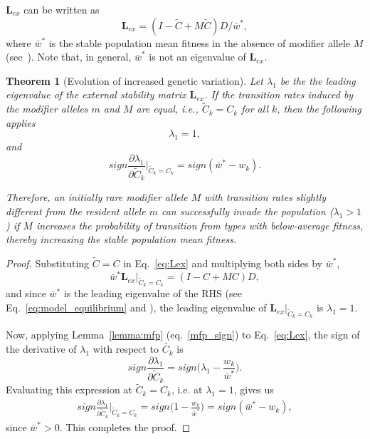 \documentclass[9pt, a4paper, twocolumn]{extarticle}
\newtheorem{theorem}{Theorem}
\newcommand{\cl}{\mathbf{L}}
\begin{document}
$\cl_{ex}$ can be written as
\begin{equation}\label{eq:Lex}
\cl_{ex} = (I - \tilde{C} + M \tilde{C}) D /\bar{w}^*,
\end{equation}
where $\bar{w}^*$ is the stable population mean fitness in the absence of modifier allele $M$ (see~).
Note that, in general, $\bar{w}^*$ is not an eigenvalue of $\cl_{ex}$.

\begin{theorem}[Evolution of increased genetic variation]
Let $\lambda_1$ be the the leading eigenvalue of the external stability matrix $\cl_{ex}$.
If the transition rates induced by the modifier alleles $m$ and $M$ are equal, i.e., $\tilde{C}_k=C_k$ for all $k$, then the following applies
\begin{equation}
\lambda_1=1,
\end{equation}
and
\begin{equation}
sign \frac{\partial \lambda_1}{\partial \tilde{C}_k}\bigg\rvert_{\tilde{C}_k = C_k} = 
sign(\bar{w}^* - w_k).
\end{equation}

Therefore, an initially rare modifier allele $M$ with transition rates slightly different from the resident allele $m$ can successfully invade the population ($\lambda_1>1$) if $M$ increases the probability of transition from types with below-average fitness, thereby increasing the stable population mean fitness.
\end{theorem}

\begin{proof}
Substituting $\tilde{C}=C$ in Eq.~\ref{eq:Lex} and multiplying both sides by $\bar{w}^*$,
\begin{equation}
\bar{w}^* \cl_{ex}\big\rvert_{\tilde{C}_k = C_k} = (I-C+MC) D,
\end{equation}
and since $\bar{w}^*$ is the leading eigenvalue of the RHS (see Eq.~\ref{eq:model_equilibrium} and ),
the leading eigenvalue of $\cl_{ex}\big\rvert_{\tilde{C}_k = C_k}$ is $\lambda_1=1$.

Now, applying Lemma~\ref{lemma:mfp} (eq.~\ref{mfp_sign}) to Eq.~\ref{eq:Lex}, the sign of the derivative of $\lambda_1$ with respect to $\tilde{C_k}$ is
\begin{equation}
sign \frac{\partial \lambda_1}{\partial \tilde{C}_k} =
sign\Big(\lambda_1 - \frac{w_k}{\bar{w}^*}\Big).
\end{equation}
Evaluating this expression at $\tilde{C}_k = C_k$, i.e. at $\lambda_1=1$, gives us
\begin{multline}
sign \frac{\partial \lambda_1}{\partial \tilde{C}_k}\bigg\rvert_{\tilde{C}_k = C_k} = 
sign\Big(1 - \frac{w_k}{\bar{w}^*}\Big) =  
sign(\bar{w}^* - w_k),
\end{multline}
since $\bar{w}^*>0$.
This completes the proof.
\end{proof}
\end{document}
